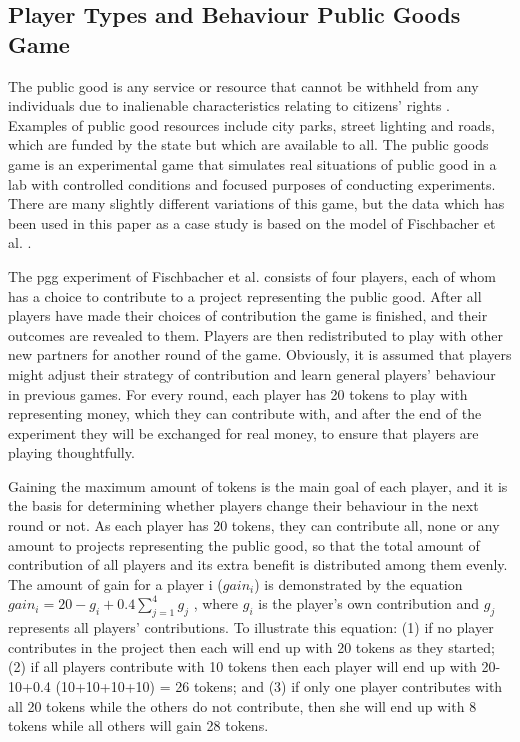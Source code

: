 \subsection{Player Types and Behaviour Public Goods Game}

The public good is any service or resource that cannot be withheld from any individuals due to inalienable characteristics relating to citizens' rights \cite{Kaul1999}. Examples of public good resources include city parks, street lighting and roads, which are funded by the state but which are available to all. The public goods game is an experimental game that simulates real situations of public good in a lab with controlled conditions and focused purposes of conducting experiments. There are many slightly different variations of this game, but the data which has been used in this paper as a case study is based on the model of Fischbacher et al. \cite{Fischbacher2012}.

The \acrfull{pgg} experiment of Fischbacher et al. \cite{Fischbacher2012} consists of four players, each of whom has a choice to contribute to a project representing the public good. After all players have made their choices of contribution the game is finished, and their outcomes are revealed to them. Players are then redistributed to play with other new partners for another round of the game. Obviously, it is assumed that players might adjust their strategy of contribution and learn general players' behaviour in previous games. For every round, each player has 20 tokens to play with representing money, which they can contribute with, and after the end of the experiment they will be exchanged for real money, to ensure that players are playing thoughtfully.

Gaining the maximum amount of tokens is the main goal of each player, and it is the basis for determining whether players change their behaviour in the next round or not. As each player has 20 tokens, they can contribute all, none or any amount to projects representing the public good, so that the total amount of contribution of all players and its extra benefit is distributed among them evenly. The amount of gain for a player i ($gain_i$) is demonstrated by the equation $gain_i=20 - g_i + 0.4\sum_{j=1}^{4} g_j$ , where $g_i$ is the player's own contribution and $g_j$ represents all players' contributions. To illustrate this equation: (1) if no player contributes in the project then each will end up with 20 tokens as they started; (2) if all players contribute with 10 tokens then each player will end up with {20-10+0.4 (10+10+10+10)} = 26 tokens; and (3) if only one player contributes with all 20 tokens while the others do not contribute, then she will end up with 8 tokens while all others will gain 28 tokens.

